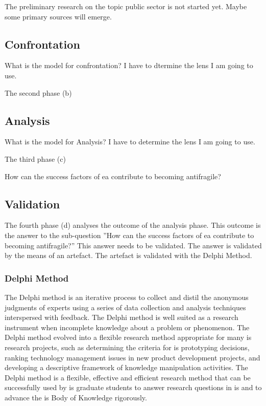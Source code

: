 \begin{remark}
	The preliminary research on the topic public sector is not started yet. Maybe some primary sources will emerge.
\end{remark}

\subsection{Confrontation}
\label{sub:confrontationphase}

\begin{remark}
	What is the model for confrontation?
	I have to dtermine the lens I am going to use.
\end{remark}


The second phase (b) 

\subsection{Analysis}
\label{sub:analysisphase}

\begin{remark}
	What is the model for Analysis?
	I have to determine the lens I am going to use.
\end{remark}

The third phase (c)

How can the success factors of \acrlong{ea} contribute to becoming antifragile?

\subsection{Validation}
\label{sub:validatinphase}
The fourth phase (d) analyses the outcome of the analysis phase. This outcome is the answer to the sub-question ''How can the success factors of \acrlong{ea} contribute to becoming antifragile?'' This answer needs to be validated. The answer is validated by the means of an artefact. The artefact is validated with the Delphi Method. \needsref

\subsubsection{Delphi Method}
\label{subsub:delphimethod}
The Delphi method is an iterative process to collect and distil the anonymous judgments of experts using a series of data collection and analysis techniques interspersed with feedback. The Delphi method is well suited as a research instrument when incomplete knowledge about a problem or phenomenon. The Delphi method evolved into a flexible research method appropriate for many \acrfull{is} research projects, such as determining the criteria for \acrshort{is} prototyping decisions, ranking technology management issues in new product development projects, and developing a descriptive framework of knowledge manipulation
activities. The Delphi method is a flexible, effective and efficient research method that can be successfully used by \acrshort{is} graduate students to answer research questions in \acrshort{is} and to advance the \acrshort{is} Body of Knowledge rigorously. \parencite{Skulmoski2007}

